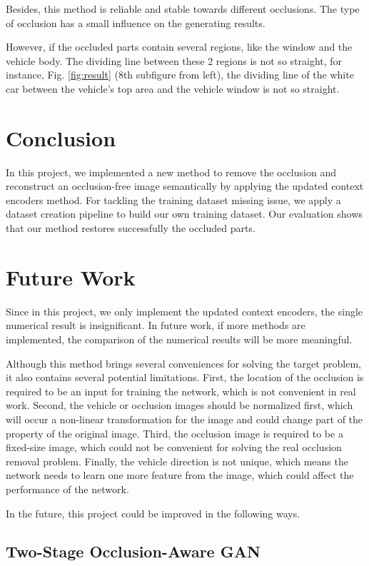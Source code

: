 Besides, this method is reliable and stable towards different occlusions. The type of occlusion has a small influence on the generating results.

However, if the occluded parts contain several regions, like the window and the vehicle body. The dividing line between these 2 regions is not so straight, for instance, Fig. \ref{fig:result} (8th subfigure from left),  the  dividing line of the white car between the vehicle's top area and the vehicle window is not so straight.



\section{Conclusion}
In this project, we implemented a new method to remove the occlusion and reconstruct an occlusion-free image semantically by applying the updated context encoders method. For tackling the training dataset missing issue, we apply a dataset creation pipeline to build our own training dataset. Our evaluation shows that our method restores successfully the occluded parts.
\section{Future Work}
Since in this project, we only implement the updated context encoders, the single numerical result is insignificant. In future work, if more methods are implemented, the comparison of the numerical results will be more meaningful.

Although this method brings several conveniences for solving the target problem, it also contains several potential limitations. First, the location of the occlusion is required to be an input for training the network, which is not convenient in real work. Second, the vehicle or occlusion images should be normalized first, which will occur a non-linear transformation for the image and could change part of the property of the original image. Third, the occlusion image is required to be a fixed-size image, which could not be convenient for solving the real occlusion removal problem.
Finally, the vehicle direction is not unique, which means the network needs to learn one more feature from the image, which could affect the performance of the network.

In the future, this project could be improved in the following ways.
\subsection{Two-Stage Occlusion-Aware GAN}

